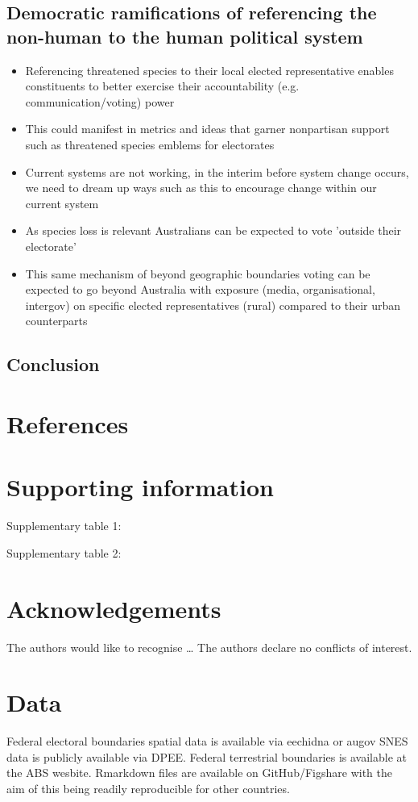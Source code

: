\documentclass[a4paper,11pt]{article}
\begin{document}
\subsection{Democratic ramifications of referencing the non-human to the human political system}

\begin{itemize}
    \item Referencing threatened species to their local elected representative enables constituents to better exercise their accountability (e.g. communication/voting) power
    \item This could manifest in metrics and ideas that garner nonpartisan support such as threatened species emblems for electorates
    \item Current systems are not working, in the interim before system change occurs, we need to dream up ways such as this to encourage change within our current system
    \item As species loss is relevant Australians can be expected to vote 'outside their electorate'
    \item This same mechanism of beyond geographic boundaries voting can be expected to go beyond Australia with exposure (media, organisational, intergov) on specific elected representatives (rural) compared to their urban counterparts
\end{itemize}

\subsection{Conclusion}

\newpage
\nolinenumbers
\section{References}
\printbibliography

\newpage
\section{Supporting information}

Supplementary table 1:

Supplementary table 2:


\newpage
\section{Acknowledgements}
The authors would like to recognise \ldots
The authors declare no conflicts of interest.

\newpage
\section{Data}
Federal electoral boundaries spatial data is available via eechidna or augov
SNES data is publicly available via DPEE.
Federal terrestrial boundaries is available at the ABS wesbite.
Rmarkdown files are available on GitHub/Figshare with the aim of this being readily reproducible for other countries.
\end{document}
